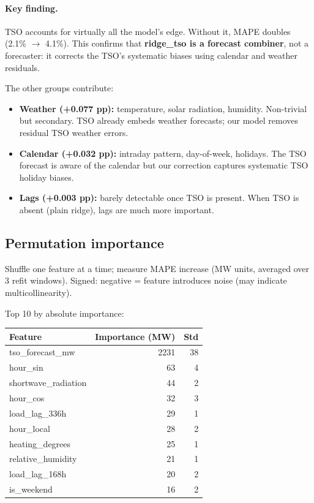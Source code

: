 \paragraph{Key finding.} TSO accounts for virtually all the model's edge.
Without it, MAPE doubles (2.1\% $\to$ 4.1\%). This confirms that
\textbf{ridge\_tso is a forecast combiner}, not a forecaster: it corrects
the TSO's systematic biases using calendar and weather residuals.

The other groups contribute:
\begin{itemize}
  \item \textbf{Weather (+0.077 pp):} temperature, solar radiation, humidity.
        Non-trivial but secondary. TSO already embeds weather forecasts; our
        model removes residual TSO weather errors.
  \item \textbf{Calendar (+0.032 pp):} intraday pattern, day-of-week,
        holidays. The TSO forecast is aware of the calendar but our correction
        captures systematic TSO holiday biases.
  \item \textbf{Lags (+0.003 pp):} barely detectable once TSO is present.
        When TSO is absent (plain ridge), lags are much more important.
\end{itemize}

\subsection{Permutation importance}

Shuffle one feature at a time; measure MAPE increase (MW units, averaged
over 3 refit windows). Signed: negative = feature introduces noise (may
indicate multicollinearity).

Top 10 by absolute importance:

\begin{center}
\begin{tabular}{lrr}
\toprule
Feature & Importance (MW) & Std \\
\midrule
tso\_forecast\_mw    & 2231 & 38  \\
hour\_sin            &   63 &  4  \\
shortwave\_radiation &   44 &  2  \\
hour\_cos            &   32 &  3  \\
load\_lag\_336h      &   29 &  1  \\
hour\_local          &   28 &  2  \\
heating\_degrees     &   25 &  1  \\
relative\_humidity   &   21 &  1  \\
load\_lag\_168h      &   20 &  2  \\
is\_weekend          &   16 &  2  \\
\bottomrule
\end{tabular}
\end{center}

